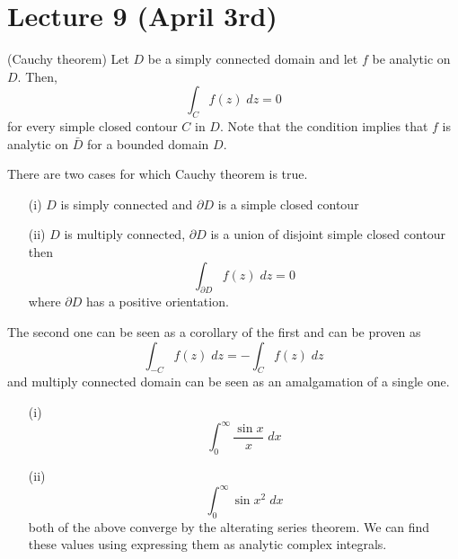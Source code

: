 \section{Lecture 9 (April 3rd)}
\begin{thm}
(Cauchy theorem) Let $D$ be a simply connected domain and let $f$ be analytic on $D$. Then,
\[\int _{C}f(z)\;dz=0\]
for every simple closed contour $C$ in $D$. Note that the condition implies that $f$ is analytic on $\bar{D}$ for a bounded domain $D$. 
\end{thm}
\vspace{2ex}
\begin{rmk}
There are two cases for which Cauchy theorem is true. 
\begin{itemize}
\item[(i)] $D$ is simply connected and $\partial D$ is a simple closed contour
\item[(ii)] $D$ is multiply connected, $\partial D$ is a union of disjoint simple closed contour
then 
\[\int _{\partial D}f(z)\;dz=0\]
where $\partial D$ has a positive orientation.
\end{itemize}
The second one can be seen as a corollary of the first and can be proven as
\[\int _{-C}f(z)\;dz=-\int _{C}f(z)\;dz\]
and multiply connected domain can be seen as an amalgamation of a single one.
\end{rmk}
\vspace{2ex}
\begin{ex}
\begin{itemize}
\item[(i)] \[\int ^{\infty }_{0}\dfrac{\sin x}{x}\;dx\]
\item[(ii)] \[\int ^{\infty }_{0}\sin x^2\;dx\]
both of the above converge by the alterating series theorem. We can find these values using expressing them as analytic complex integrals. 
\end{itemize}
\end{ex}
\vspace{2ex}
